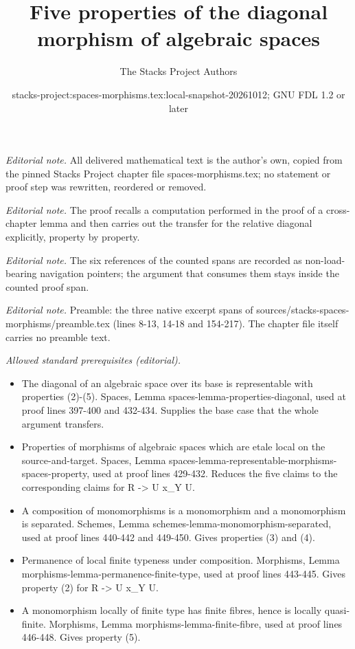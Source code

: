 \documentclass[10pt,a4paper]{amsart}
\title{Five properties of the diagonal morphism of algebraic spaces}
\author{The Stacks Project Authors}
\date{stacks-project:spaces-morphisms.tex:local-snapshot-20261012; GNU FDL 1.2 or later}
\theoremstyle{plain}
\theoremstyle{definition}
\theoremstyle{remark}
\numberwithin{equation}{subsection}
\begin{document}
\maketitle
\setcounter{subsection}{1}
\noindent\textit{Editorial note.} All delivered mathematical text is the author's own, copied from the pinned Stacks Project chapter file spaces-morphisms.tex; no statement or proof step was rewritten, reordered or removed.\par\medskip
\noindent\textit{Editorial note.} The proof recalls a computation performed in the proof of a cross-chapter lemma and then carries out the transfer for the relative diagonal explicitly, property by property.\par\medskip
\noindent\textit{Editorial note.} The six references of the counted spans are recorded as non-load-bearing navigation pointers; the argument that consumes them stays inside the counted proof span.\par\medskip
\noindent\textit{Editorial note.} Preamble: the three native excerpt spans of sources/stacks-spaces-morphisms/preamble.tex (lines 8-13, 14-18 and 154-217). The chapter file itself carries no preamble text.\par\medskip
\noindent\textit{Allowed standard prerequisites (editorial).}\begin{itemize}
\item The diagonal of an algebraic space over its base is representable with properties (2)-(5). Spaces, Lemma spaces-lemma-properties-diagonal, used at proof lines 397-400 and 432-434. Supplies the base case that the whole argument transfers.
\item Properties of morphisms of algebraic spaces which are etale local on the source-and-target. Spaces, Lemma spaces-lemma-representable-morphisms-spaces-property, used at proof lines 429-432. Reduces the five claims to the corresponding claims for R -> U x\_Y U.
\item A composition of monomorphisms is a monomorphism and a monomorphism is separated. Schemes, Lemma schemes-lemma-monomorphism-separated, used at proof lines 440-442 and 449-450. Gives properties (3) and (4).
\item Permanence of local finite typeness under composition. Morphisms, Lemma morphisms-lemma-permanence-finite-type, used at proof lines 443-445. Gives property (2) for R -> U x\_Y U.
\item A monomorphism locally of finite type has finite fibres, hence is locally quasi-finite. Morphisms, Lemma morphisms-lemma-finite-fibre, used at proof lines 446-448. Gives property (5).
\end{itemize}\medskip
\end{document}
